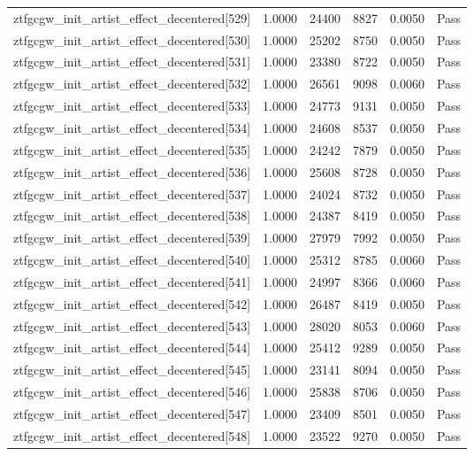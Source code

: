 \begin{table}[htbp]
\begin{tabular}{llrrll}
ztfgcgw\_init\_artist\_effect\_decentered[529] & 1.0000 & 24400 & 8827 & 0.0050 & Pass \\
ztfgcgw\_init\_artist\_effect\_decentered[530] & 1.0000 & 25202 & 8750 & 0.0050 & Pass \\
ztfgcgw\_init\_artist\_effect\_decentered[531] & 1.0000 & 23380 & 8722 & 0.0050 & Pass \\
ztfgcgw\_init\_artist\_effect\_decentered[532] & 1.0000 & 26561 & 9098 & 0.0060 & Pass \\
ztfgcgw\_init\_artist\_effect\_decentered[533] & 1.0000 & 24773 & 9131 & 0.0050 & Pass \\
ztfgcgw\_init\_artist\_effect\_decentered[534] & 1.0000 & 24608 & 8537 & 0.0050 & Pass \\
ztfgcgw\_init\_artist\_effect\_decentered[535] & 1.0000 & 24242 & 7879 & 0.0050 & Pass \\
ztfgcgw\_init\_artist\_effect\_decentered[536] & 1.0000 & 25608 & 8728 & 0.0050 & Pass \\
ztfgcgw\_init\_artist\_effect\_decentered[537] & 1.0000 & 24024 & 8732 & 0.0050 & Pass \\
ztfgcgw\_init\_artist\_effect\_decentered[538] & 1.0000 & 24387 & 8419 & 0.0050 & Pass \\
ztfgcgw\_init\_artist\_effect\_decentered[539] & 1.0000 & 27979 & 7992 & 0.0050 & Pass \\
ztfgcgw\_init\_artist\_effect\_decentered[540] & 1.0000 & 25312 & 8785 & 0.0060 & Pass \\
ztfgcgw\_init\_artist\_effect\_decentered[541] & 1.0000 & 24997 & 8366 & 0.0060 & Pass \\
ztfgcgw\_init\_artist\_effect\_decentered[542] & 1.0000 & 26487 & 8419 & 0.0050 & Pass \\
ztfgcgw\_init\_artist\_effect\_decentered[543] & 1.0000 & 28020 & 8053 & 0.0060 & Pass \\
ztfgcgw\_init\_artist\_effect\_decentered[544] & 1.0000 & 25412 & 9289 & 0.0050 & Pass \\
ztfgcgw\_init\_artist\_effect\_decentered[545] & 1.0000 & 23141 & 8094 & 0.0050 & Pass \\
ztfgcgw\_init\_artist\_effect\_decentered[546] & 1.0000 & 25838 & 8706 & 0.0050 & Pass \\
ztfgcgw\_init\_artist\_effect\_decentered[547] & 1.0000 & 23409 & 8501 & 0.0050 & Pass \\
ztfgcgw\_init\_artist\_effect\_decentered[548] & 1.0000 & 23522 & 9270 & 0.0050 & Pass \\

\end{tabular}
\end{table}
